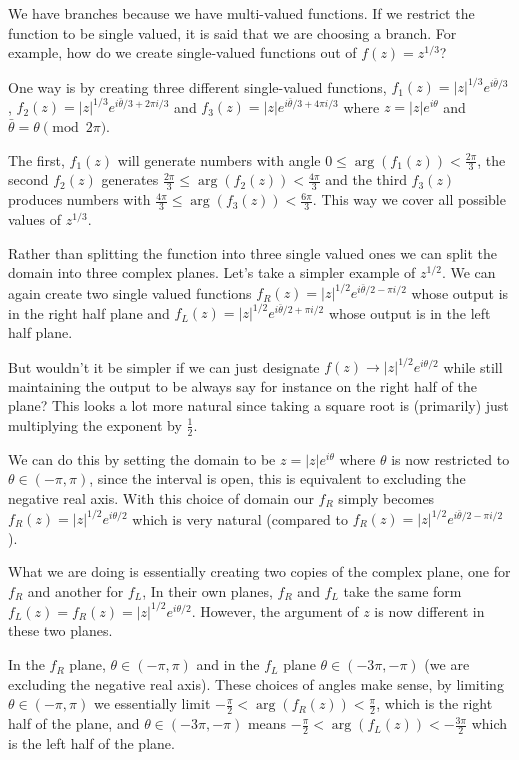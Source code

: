 \documentclass[aps,preprint,preprintnumbers,nofootinbib,showpacs,prd]{revtex4-1}
\begin{document}
We have branches because we have multi-valued functions. If we restrict the function to be single valued, it is said that we are choosing a branch. For example, how do we create single-valued functions out of $f(z) = z^{1/3}$?

One way is by creating three different single-valued functions, $f_1(z) = |z|^{1/3}e^{i\bar\theta/3}$, $f_2(z) = |z|^{1/3} e^{i\bar\theta/3 + 2\pi i/3}$ and $f_3(z) = |z| e^{i\bar\theta/3 + 4\pi i / 3}$ where $z = |z| e^{i\theta}$ and $\bar\theta = \theta \pmod{2\pi}$. 

The first, $f_1(z)$ will generate numbers with angle $0 \le \arg (f_1(z)) < \tfrac{2\pi}{3}$, the second $f_2(z)$ generates $\tfrac{2\pi}{3} \le \arg (f_2(z)) < \tfrac{4\pi}{3}$ and the third $f_3(z)$ produces numbers with $\tfrac{4\pi}{3} \le \arg (f_3(z)) < \tfrac{6\pi}{3}$. This way we cover all possible values of $z^{1/3}$.

Rather than splitting the function into three single valued ones we can split the domain into three complex planes. Let's take a simpler example of $z^{1/2}$. We can again create two single valued functions $f_R(z) = |z|^{1/2} e^{i\bar\theta/2 -\pi i/2}$ whose output is in the right half plane and $f_L(z) = |z|^{1/2} e^{i\bar\theta/2 + \pi i/2}$ whose output is in the left half plane.

But wouldn't it be simpler if we can just designate $f(z) \to |z|^{1/2} e^{i\theta/2}$ while still maintaining the output to be always say for instance on the right half of the plane? This looks a lot more natural since taking a square root is (primarily) just multiplying the exponent by $\tfrac{1}{2}$.

We can do this by setting the domain to be $z = |z|e^{i\theta}$ where $\theta$ is now restricted to $\theta \in (-\pi,\pi)$, since the interval is open, this is equivalent to excluding the negative real axis. With this choice of domain our $f_R$ simply becomes $f_R(z) = |z|^{1/2} e^{i\theta/2}$ which is very natural (compared to $f_R(z) = |z|^{1/2} e^{i\bar\theta/2 -\pi i/2}$).

What we are doing is essentially creating two copies of the complex plane, one for $f_R$ and another for $f_L$, In their own planes, $f_R$ and $f_L$ take the same form $f_L(z) = f_R(z) = |z|^{1/2} e^{i\theta/2}$. However, the argument of $z$ is now different in these two planes.

In the $f_R$ plane, $\theta \in (-\pi, \pi)$ and in the $f_L$ plane $\theta \in (-3\pi, -\pi)$ (we are excluding the negative real axis). These choices of angles make sense, by limiting $\theta \in (-\pi, \pi)$ we essentially limit $ -\frac{\pi}{2} < \arg(f_R(z)) < \frac{\pi}{2}$, which is the right half of the plane, and $\theta \in (-3\pi, -\pi)$ means $ -\frac{\pi}{2} < \arg(f_L(z)) < -\frac{3\pi}{2}$ which is the left half of the plane.
\end{document}
